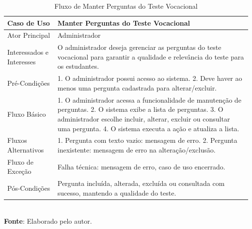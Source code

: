 \begin{table}[h!]
\centering
\caption{Fluxo de Manter Perguntas do Teste Vocacional}
\begin{tabular}{|m{4cm}|m{11cm}|}
\hline
\textbf{Caso de Uso}   & \textbf{Manter Perguntas do Teste Vocacional} \\
\hline
Ator Principal & Administrador\\
\hline
Interessados e Interesses & O administrador deseja gerenciar as perguntas do teste vocacional para garantir a qualidade e relevância do teste para os estudantes. \\
\hline
Pré-Condições & 

1. O administrador possui acesso ao sistema.
2. Deve haver ao menos uma pergunta cadastrada para alterar/excluir. \\
\hline
Fluxo Básico & 

1. O administrador acessa a funcionalidade de manutenção de perguntas.
2. O sistema exibe a lista de perguntas.
3. O administrador escolhe incluir, alterar, excluir ou consultar uma pergunta.
4. O sistema executa a ação e atualiza a lista.
\\
\hline
Fluxos Alternativos & 

1. Pergunta com texto vazio: mensagem de erro.
2. Pergunta inexistente: mensagem de erro na alteração/exclusão.
\\
\hline
Fluxo de Exceção & Falha técnica: mensagem de erro, caso de uso encerrado. \\
\hline
Pós-Condições & Pergunta incluída, alterada, excluída ou consultada com sucesso, mantendo a qualidade do teste.\\
\hline
\end{tabular}
\label{table:casos-de-uso}
\\[1ex]
\footnotesize \textbf{Fonte}: Elaborado pelo autor.
\end{table}

